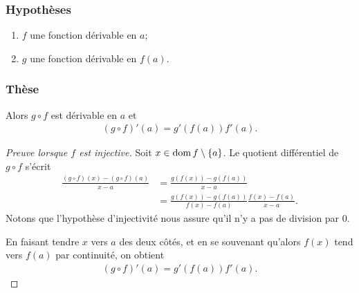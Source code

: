 \documentclass[main.tex]{subfiles}
\begin{document}
\begin{proposition}

    \subsubsection{Hypothèses}

    \begin{enumerate}
        \item $f$ une fonction dérivable en $a$;
        \item $g$ une fonction dérivable en $f(a)$.
    \end{enumerate}

    \subsubsection{Thèse}

    Alors $g \circ f$ est dérivable en $a$ et
    \begin{align}
        (g \circ f)'(a) = g'(f(a)) f'(a).
    \end{align}
\end{proposition}
\begin{proof}[Preuve lorsque $f$ est injective]
    Soit $x \in \operatorname{dom} f \setminus \{a\}$.
    Le quotient différentiel de $g \circ f$ s'écrit
    \begin{align}
        \frac {(g \circ f)(x) - (g \circ f)(a)} {x - a}
        &= \frac {g(f(x)) - g(f(a))} {x - a}\\
        &= \frac {g(f(x)) - g(f(a))} {f(x) - f(a)} \frac {f(x) - f(a)} {x - a}.
    \end{align}
    Notons que l'hypothèse d'injectivité nous assure qu'il n'y a pas de division par $0$.

    En faisant tendre $x$ vers $a$ des deux côtés,
    et en se souvenant qu'alors $f(x)$ tend vers $f(a)$ par continuité,
    on obtient
    \begin{align}
        (g \circ f)'(a) = g'(f(a)) f'(a).
    \end{align}
\end{proof}
\end{document}
